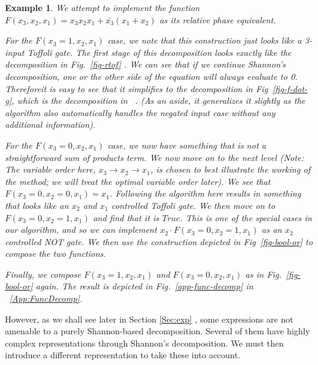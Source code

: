 \documentclass[paper]{ieice}
\newtheorem{example}{Example}
\providecommand{\DIFadd}[1]{{\protect\color{blue}{#1}}} %
\providecommand{\DIFaddbegin}{} %
\providecommand{\DIFaddend}{} %
\newcommand{\DIFaddincludegraphics}[2][]{{\color{blue}\fbox{\DIFOincludegraphics[#1]{#2}}}} %
\DeclareRobustCommand{\DIFaddbegin}{\DIFOaddbegin \let\includegraphics\DIFaddincludegraphics} %
\DeclareRobustCommand{\DIFaddend}{\DIFOaddend \let\includegraphics\DIFOincludegraphics} %
\begin{document}
\begin{example}
  \label{ex-bool}
  We attempt to implement the function $F(x_3,x_2,x_1) = x_3x_2x_1 + \bar{x_3}(x_1 + x_2)$ as its relative phase equivalent.

  For the $F(x_3 = 1,x_2,x_1)$ case, we note that this construction just looks like a 3-input Toffoli gate. The first stage of this decomposition looks exactly like the decomposition in Fig.~\ref{fig-rtof} . We can see that if we continue Shannon's decomposition, one or the other side of the equation will always evaluate to 0. Therefore\DIFaddbegin \DIFadd{, }\DIFaddend it is easy to see that it simplifies to the
  decomposition in Fig~\ref{fig-f-dot-g}, which is the decomposition in ~\cite{bib-amy-phase-state}.
  (As an aside, it generalizes it slightly as the algorithm also automatically handles the negated input
  case without any additional information). %

  For the $F(x_3 = 0,x_2,x_1)$ case, we now have something that is not a straightforward sum of products term.
  We now move on to the next level (Note: The variable order here, $x_3 \rightarrow x_2 \rightarrow x_1$, is chosen to best illustrate the working of the method; we will treat the optimal variable order later). We see that $F(x_3 = 0,x_2=0,x_1) = x_1$. Following the algorithm here results in something that looks like an $x_2$
  and $x_1$ controlled Toffoli gate. We then move on to $F(x_3 = 0,x_2=1,x_1)$ and find that it is $True$.
  This is one of the special cases in our algorithm, and so we can implement $x_2 \cdot F(x_3 = 0,x_2=1,x_1)$
  as an $x_2$ controlled NOT gate. We then use the construction depicted in Fig~\ref{fig-bool-or} to compose
  the two functions. %

  Finally, we compose $F(x_3 = 1,x_2,x_1)$ and $F(x_3 = 0,x_2,x_1)$ as in Fig.~\ref{fig-bool-or} again. The result is depicted in Fig.~\ref{app-func-decomp} in ~\ref{App:FuncDecomp}.
\end{example}

However, as we shall see later in Section \ref{Sec:exp} , some expressions are not amenable to a purely Shannon-based decomposition. Several of them have highly complex representations through Shannon's decomposition.
We must then introduce a different representation to take these into account.
\end{document}
